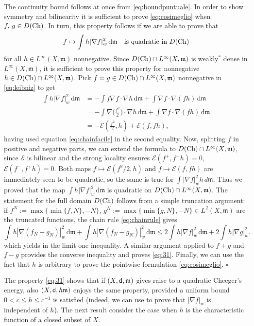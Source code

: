 \documentclass[reqno,11pt]{article}
\numberwithin{equation}{section}
\newcommand{\C}{\mathbb{C}}
\newcommand{\mm}{{\mbox{\boldmath$m$}}}
\newcommand{\sfd}{{\sf d}}
\renewcommand{\d}{{\mathrm d}}
\newenvironment{proof}{\removelastskip\par\medskip   %
\noindent{\em Proof.}
\rm}{\penalty-20\null\hfill$\square$\par\medbreak}
\newcommand{\weakgrad}[1]{|\nabla #1|_w}                %
\renewcommand{\C}{{\rm Ch}}
\renewcommand{\mm}{\mathfrak m}
\begin{document}
\begin{proof}
The continuity bound follows at once from \eqref{eq:boundpuntuale}.
In order to show symmetry and bilinearity it is sufficient to prove
\eqref{eq:cosimeglio} when $f,\,g\in D(\C)$. In turn, this property
follows if we are able to prove that
\begin{equation}\label{eq:31}
f\mapsto\int h\weakgrad f^2\,\d\mm\quad\text{is quadratic in
$D(\C)$}
\end{equation}
for all $h\in L^\infty(X,\mm)$ nonnegative. Since $D(\C)\cap
L^\infty(X,\mm)$ is weakly$^*$ dense in $L^\infty(X,\mm)$, it is
sufficient to prove this property for nonnegative $h\in D(\C)\cap
L^\infty(X,\mm)$. Pick $f=g\in D(\C)\cap L^\infty(X,\mm)$
nonnegative in \eqref{eq:leibniz} to get
\[
\begin{split}
\int h\weakgrad f^2\,\d\mm& =
-\int f\nabla f\cdot\nabla h\,\d\mm+\int\nabla f\cdot\nabla(fh)\,\d\mm\\
&=-\int \nabla\big(\frac{f^2}2\big)\cdot\nabla h\,\d\mm+\int\nabla
f\cdot\nabla(fh)\,\d\mm\\&= -\mathcal E(\frac{f^2}2,h)+\mathcal
E(f,fh),
\end{split}
\]
having used equation \eqref{eq:chainfacile} in the second equality.
Now, splitting $f$ in positive and negative parts, we can extend the
formula to $D(\C)\cap L^\infty(X,\mm)$, since $\mathcal E$ is
bilinear and the strong locality ensures $\mathcal E(f^+,f^-h)=0$,
$\mathcal E(f^-,f^+h)=0$. Both maps $f\mapsto \mathcal E(f^2/2,h)$
and $f\mapsto \mathcal E(f,fh)$ are immediately seen to be
quadratic, so the same is true for $\int \weakgrad f^2h\,d\mm$. Thus
we proved that the map $\int h\weakgrad f^2\,\d\mm$ is quadratic on
$D(\C)\cap L^\infty(X,\mm)$. The statement for the full domain
$D(\C)$ follows from a simple truncation argument: if
$f^N:=\max\{\min\{f,N\},-N\},\,g^N:=\max\{\min\{g,N\},-N\}\in
L^2(X,\mm)$ are the truncated functions, the chain rule
\eqref{eq:chainrule} gives
$$
\int h\weakgrad{(f_N+g_N)}^2\,\d\mm+\int
h\weakgrad{(f_N-g_N)}^2\,\d\mm\leq 2\int
h\weakgrad{f}^2\,\d\mm+2\int h\weakgrad{g}^2.
$$
which yields in the limit one inequality. A similar argument applied
to $f+g$ and $f-g$ provides the converse inequality and proves
\eqref{eq:31}. Finally, we can use the fact that $h$ is arbitrary to
prove the pointwise formulation \eqref{eq:cosimeglio}.
\end{proof}

The property \eqref{eq:31} shows that if $(X,\sfd,\mm)$ gives raise
to a quadratic Cheeger's energy, also $(X,\sfd,h\mm)$ enjoys the
same property, provided a uniform bound $0<c\le h\le c^{-1}$ is
satisfied (indeed, we can use \cite[Lemma
4.11]{Ambrosio-Gigli-Savare11} to prove that $\weakgrad{f}$ is
independent of $h$). The next result consider the case when $h$ is
the characteristic function of a closed subset of $X$.
\end{document}
